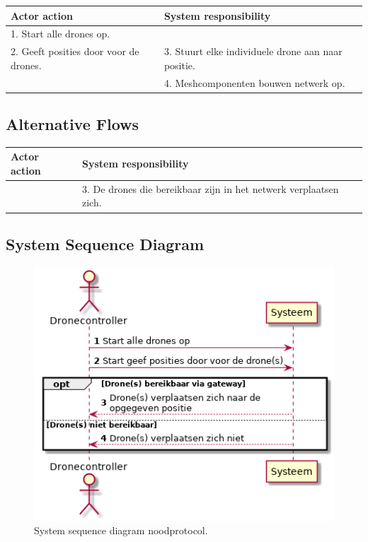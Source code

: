 \documentclass[a4paper, 11pt, oneside]{report}
\begin{document}
\begin{table}[H]
	\centering
	\begin{tabular}{|l|l|}
		\hline
		\rowcolor[HTML]{C0C0C0} 
		Actor action  & System responsibility   \\ \hline
		1. Start alle drones op. 		& \\ \hline
		2. Geeft posities door voor de drones.  & 3. Stuurt elke individuele drone aan naar positie.    \\ \hline
												& 4. Meshcomponenten bouwen netwerk op.                 \\ \hline
	\end{tabular}
\end{table}

\subsection{Alternative Flows}


\begin{table}[H]
	\centering
	\begin{tabular}{|l|l|}
		\hline
		\rowcolor[HTML]{C0C0C0} 
		Actor action  & System responsibility   \\ \hline
		& 3. De drones die bereikbaar zijn in het netwerk verplaatsen zich.      	    \\ \hline
	\end{tabular}
\end{table}

\subsection{System Sequence Diagram }
\label{Usecase:ontplooien:systemsequence}


\begin{figure}[H]
	\begin{center}\includegraphics[height=.3\textheight]{UML/out/usecase/sequence/ontplooien/ontplooien.png}\end{center}
	\caption{System sequence diagram noodprotocol.}
	\label{fig:ontplooien:systemsequence}
\end{figure}
\end{document}
